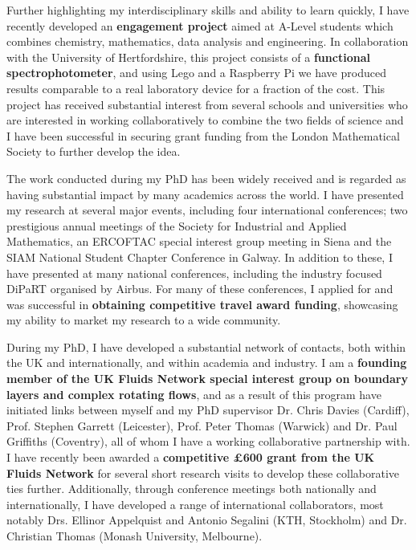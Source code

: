 \documentclass[11pt,a4paper,sans]{moderncv}        %
\begin{document}
Further highlighting my interdisciplinary skills and ability to learn quickly, I have recently developed an \textbf{engagement project} aimed at A-Level students which combines chemistry, mathematics, data analysis and engineering. In collaboration with the University of Hertfordshire, this project consists of a \textbf{functional spectrophotometer}, and using Lego and a Raspberry Pi we have produced results comparable to a real laboratory device for a fraction of the cost. This project has received substantial interest from several schools and universities who are interested in working collaboratively to combine the two fields of science and I have been successful in securing grant funding from the London Mathematical Society to further develop the idea.

The work conducted during my PhD has been widely received and is regarded as having substantial impact by many academics across the world. I have presented my research at several major events, including four international conferences; two prestigious annual meetings of the Society for Industrial and Applied Mathematics, an ERCOFTAC special interest group meeting in Siena and the SIAM National Student Chapter Conference in Galway. In addition to these, I have presented at many national conferences, including the industry focused DiPaRT organised by Airbus. For many of these conferences, I applied for and was successful in \textbf{obtaining competitive travel award funding}, showcasing my ability to market my research to a wide community.

During my PhD, I have developed a substantial network of contacts, both within the UK and internationally, and within academia and industry. I am a \textbf{founding member of the UK Fluids Network special interest group on boundary layers and complex rotating flows}, and as a result of this program have initiated links between myself and my PhD supervisor Dr. Chris Davies (Cardiff), Prof. Stephen Garrett (Leicester), Prof. Peter Thomas (Warwick) and Dr. Paul Griffiths (Coventry), all of whom I have a working collaborative partnership with. I have recently been awarded a \textbf{competitive £600 grant from the UK Fluids Network} for several short research visits to develop these collaborative ties further. Additionally, through conference meetings both nationally and internationally, I have developed a range of international collaborators, most notably Drs. Ellinor Appelquist and Antonio Segalini (KTH, Stockholm) and Dr. Christian Thomas (Monash University, Melbourne).
\end{document}

